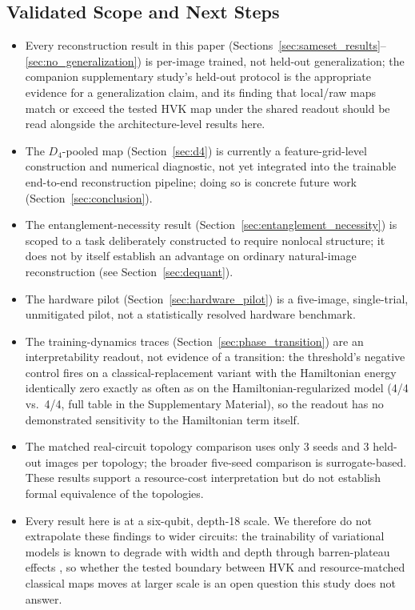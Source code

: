 \documentclass[sn-mathphys,Numbered]{sn-jnl}
\begin{document}
\subsection{Validated Scope and Next Steps}
\label{sec:limitations}
\begin{itemize}
    \item Every reconstruction result in this paper (Sections~\ref{sec:sameset_results}--\ref{sec:no_generalization}) is per-image trained, not held-out generalization; the companion supplementary study's held-out protocol is the appropriate evidence for a generalization claim, and its finding that local/raw maps match or exceed the tested HVK map under the shared readout should be read alongside the architecture-level results here.
    \item The $D_4$-pooled map (Section~\ref{sec:d4}) is currently a feature-grid-level construction and numerical diagnostic, not yet integrated into the trainable end-to-end reconstruction pipeline; doing so is concrete future work (Section~\ref{sec:conclusion}).
    \item The entanglement-necessity result (Section~\ref{sec:entanglement_necessity}) is scoped to a task deliberately constructed to require nonlocal structure; it does not by itself establish an advantage on ordinary natural-image reconstruction (see Section~\ref{sec:dequant}).
    \item The hardware pilot (Section~\ref{sec:hardware_pilot}) is a five-image, single-trial, unmitigated pilot, not a statistically resolved hardware benchmark.
    \item The training-dynamics traces (Section~\ref{sec:phase_transition}) are an interpretability readout, not evidence of a transition: the threshold's negative control fires on a classical-replacement variant with the Hamiltonian energy identically zero exactly as often as on the Hamiltonian-regularized model (4/4 vs.\ 4/4, full table in the Supplementary Material), so the readout has no demonstrated sensitivity to the Hamiltonian term itself.
    \item The matched real-circuit topology comparison uses only 3 seeds and 3 held-out images per topology; the broader five-seed comparison is surrogate-based. These results support a resource-cost interpretation but do not establish formal equivalence of the topologies.
    \item Every result here is at a six-qubit, depth-18 scale. We therefore do not extrapolate these findings to wider circuits: the trainability of variational models is known to degrade with width and depth through barren-plateau effects \cite{McClean2018, Larocca2025}, so whether the tested boundary between HVK and resource-matched classical maps moves at larger scale is an open question this study does not answer.
\end{itemize}
\end{document}
